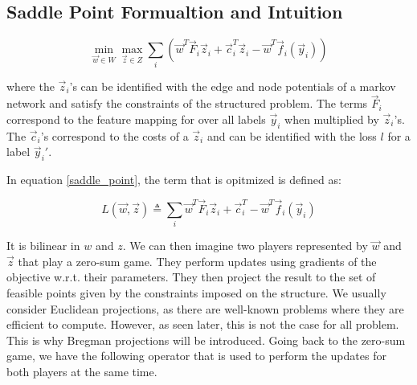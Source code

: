 \subsection{Saddle Point Formualtion and Intuition}
\begin{equation}
  \min_{\vec w \in {W}} \max_{\vec z \in {Z}} \sum_i \left( \vec
w^T \vec F_i \vec z_i + \vec c_i^T \vec z_i - \vec w^T \vec f_i(\vec y_i)
\right)
  \label{saddle_point}
\end{equation}

where the $\vec z_i$'s can be identified with the edge and node potentials of a
markov network and satisfy the constraints of the structured problem. The terms
$\vec F_i$ correspond to the feature mapping for over all labels $\vec y_i$ when
multiplied by $\vec z_i$'s. The $\vec c_i$'s correspond to the costs of a $\vec z_i$ and can be
identified with the loss $l$ for a label $\vec y_i'$.

In equation \ref{saddle_point}, the term that is opitmized is defined
as:

\begin{equation}
  {L}(\vec w,\vec z) \triangleq \sum_i \vec w^T \vec F_i \vec z_i + \vec
c_i^T - \vec w^T \vec f_i(\vec y_i)
  \label{saddle_obj}
\end{equation}

It is bilinear in $w$ and $z$. We can then imagine two players represented by
$\vec w$ and $\vec z$ that play a zero-sum game. They perform updates using gradients of
the objective w.r.t. their parameters. They then project the result to the set
of feasible points given by the constraints imposed on the structure. We usually
consider Euclidean projections, as there are well-known problems where they are
efficient to compute. However, as seen later, this is not the case for all
problem. This is why Bregman projections will be introduced. Going back to the
zero-sum game, we have the following operator that is used to perform the
updates for both players at the same time.

